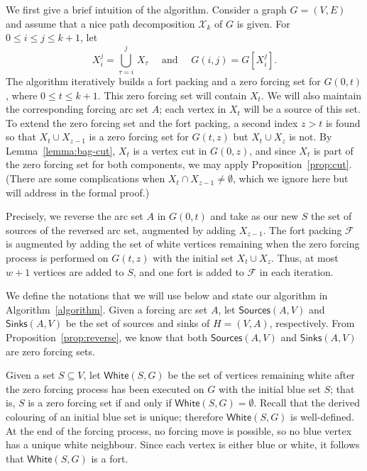 \documentclass[12pt]{amsart}
\theoremstyle{plain}
\theoremstyle{definition}
\def\F{\mathcal F}
\def\X{\mathcal X}
\newcommand{\sources}{\mathsf{Sources}}
\newcommand{\sinks}{\mathsf{Sinks}}
\newcommand{\white}{\mathsf{White}}
\begin{document}
We first give a brief intuition of the algorithm. 
Consider a graph $G=(V, E)$ and assume that a nice path decomposition $\X_k$
of $G$ is given.  For $0\leq i\leq j\leq k+1$, let 
\begin{equation*}
    X_i^{j}=\bigcup_{\tau=i}^{j}\,X_\tau\quad\text{ and }\quad G(i,j)=G[X_i^{j}].
\end{equation*} 
The algorithm iteratively builds a fort packing and a zero forcing set for $G(0,t)$, where $0\leq t\leq k+1$. This zero forcing set will contain $X_t$. We will also maintain the corresponding forcing arc set $A$; each vertex in $X_t$ will be a source of this set. To extend the zero forcing set and the fort packing, a second index $z>t$ is found so that $X_t\cup X_{z-1}$ is a zero forcing set for $G(t,z)$ but $X_t\cup X_z$ is not. By Lemma~\ref{lemma:bag-cut}, $X_t$ is a vertex cut in $G(0,z)$, and since $X_t$ is part of the zero forcing set for both components, we may apply Proposition~\ref{prop:cut}. (There are some complications when $X_t\cap X_{z-1}\neq\emptyset$, which we ignore here but will address in the formal proof.) 

Precisely, we reverse the arc set $A$ in $G(0,t)$ and take as our new $S$ the set of sources of the reversed arc set, augmented by adding $X_{z-1}$. The fort packing $\F$ is augmented by adding the set of white vertices remaining when the zero forcing process is performed on $G(t,z)$ with the initial set $X_t\cup X_z$. Thus, at most $w+1$ vertices are added to $S$, and one fort is added to $\F$ in each iteration.






We define the notations that we will use below and state our algorithm in Algorithm~\ref{algorithm}.
Given a forcing arc set $A$, let $\sources(A, V)$ and $\sinks(A, V)$ be the set of sources and sinks of $H=(V, A)$, respectively. From Proposition~\ref{prop:reverse}, we know that both $\sources(A, V)$ and $\sinks(A, V)$ are zero forcing sets. 

Given a set $S\subseteq V$, let $\white(S,G)$ be the set of vertices remaining white after the zero forcing process has been executed on $G$ with the initial blue set $S$; that is, $S$ is a zero forcing set if and only if $\white(S,G)=\emptyset$. 
Recall that the derived colouring of an initial blue set is unique; therefore $\white(S, G)$ is well-defined.
At the end of the forcing process, no forcing move is possible, so no blue vertex has a unique white neighbour. Since each vertex is either blue or white, it follows that $\white(S,G)$ is a fort. 
\end{document}
